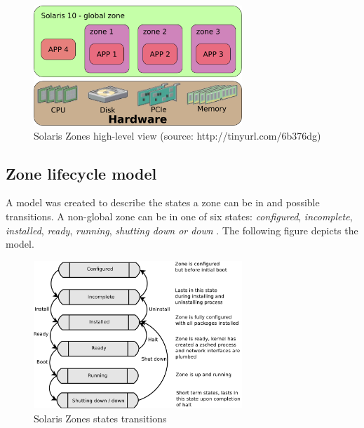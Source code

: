\documentclass[11pt]{book}
\begin{document}
        \begin{figure}[H]
          \begin{center}
            \includegraphics[width=0.7\textwidth]{img/solaris/zones.png}
          \end{center}

          \caption{Solaris Zones high-level view (source: http://tinyurl.com/6b376dg)}
        \end{figure}


      \subsection{Zone lifecycle model}
      \label{sub:}

        A model was created to describe the states a zone can be in and possible transitions. A non-global zone can be
        in one of six states: \textit{configured}, \textit{incomplete}, \textit{installed}, \textit{ready},
        \textit{running}, \textit{shutting down or down} \cite{sag}. The following figure depicts the model.

        \begin{figure}[H]
          \begin{center}
            \includegraphics[width=0.7\textwidth]{img/solaris/zone_states.pdf}
          \end{center}

          \caption{Solaris Zones states transitions}
        \end{figure}
\end{document}
